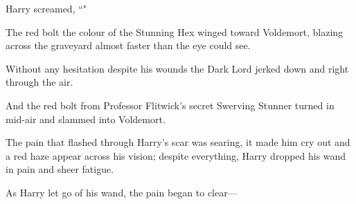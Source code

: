 Harry screamed, ``"

The red bolt the colour of the Stunning Hex winged toward Voldemort, blazing across the graveyard almost faster than the eye could see.

Without any hesitation despite his wounds the Dark Lord jerked down and right through the air.

And the red bolt from Professor Flitwick's secret Swerving Stunner turned in mid-air and slammed into Voldemort.

The pain that flashed through Harry's scar was searing, it made him cry out and a red haze appear across his vision; despite everything, Harry dropped his wand in pain and sheer fatigue.

As Harry let go of his wand, the pain began to clear—

